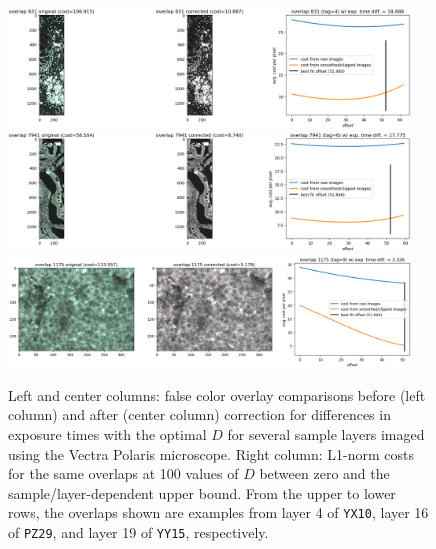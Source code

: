 \documentclass[letterpaper,11pt]{article}
\begin{document}
\begin{figure}[!ht]
\centering
\includegraphics[width=0.95\textwidth]{images/methods/cost_examples_polaris/overlay_comp_random_4357_offset=51.980}
\includegraphics[width=0.95\textwidth]{images/methods/cost_examples_polaris/overlay_comp_random_2668_offset=51.848}
\includegraphics[width=0.95\textwidth]{images/methods/cost_examples_polaris/overlay_comp_random_1554_offset=51.000}
\caption{\footnotesize Left and center columns: false color overlay comparisons before (left column) and after (center column) correction for differences in exposure times with the optimal $D$ for several sample layers imaged using the Vectra Polaris microscope. Right column: L1-norm costs for the same overlaps at 100 values of $D$ between zero and the sample/layer-dependent upper bound. From the upper to lower rows, the overlaps shown are examples from layer 4 of \texttt{YX10}, layer 16 of \texttt{PZ29}, and layer 19 of \texttt{YY15}, respectively.}
\label{fig:overlap_cost_examples_polaris_1}
\end{figure}
\end{document}
